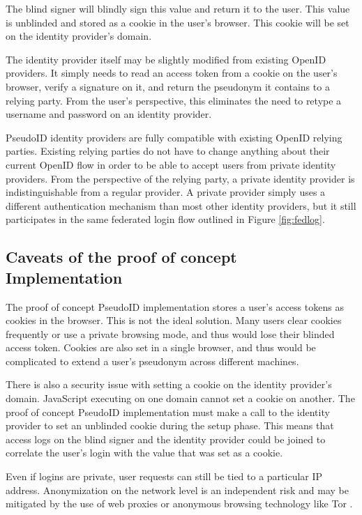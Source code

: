 \documentclass{llncs}
\begin{document}
The blind signer will blindly sign this value and return it to the
user. This value is unblinded and stored as a cookie in the user's
browser. This cookie will be set on the identity provider's domain.

The identity provider itself may be slightly modified from existing
OpenID providers. It simply needs to read an access token from a
cookie on the user's browser, verify a signature on it, and return the
pseudonym it contains to a relying party. From the user's perspective,
this eliminates the need to retype a username and password on an
identity provider.

PseudoID identity providers are fully compatible with existing OpenID
relying parties. Existing relying parties do not have to change
anything about their current OpenID flow in order to be able to accept
users from private identity providers. From the perspective of the
relying party, a private identity provider is indistinguishable from a
regular provider. A private provider simply uses a different
authentication mechanism than most other identity providers, but it
still participates in the same federated login flow outlined in Figure
\ref{fig:fedlog}.

\subsection{Caveats of the proof of concept Implementation}
\label{subsec:caveats}

The proof of concept PseudoID implementation stores a user's access
tokens as cookies in the browser. This is not the ideal solution. Many
users clear cookies frequently or use a private browsing mode, and
thus would lose their blinded access token. Cookies are also set in a
single browser, and thus would be complicated to extend a user's
pseudonym across different machines.

There is also a security issue with setting a cookie on the identity
provider's domain. JavaScript executing on one domain cannot set a
cookie on another. The proof of concept PseudoID implementation must
make a call to the identity provider to set an unblinded cookie during
the setup phase. This means that access logs on the blind signer and
the identity provider could be joined to correlate the user's login
with the value that was set as a cookie. 

Even if logins are private, user requests can still be tied to a
particular IP address. Anonymization on the network level is an
independent risk and may be mitigated by the use of web proxies or
anonymous browsing technology like Tor \cite{Tor}. 
\end{document}
